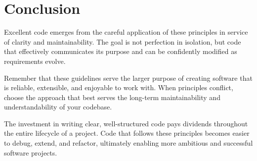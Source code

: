 \documentclass[11pt,a4paper]{article}
\begin{document}
\section{Conclusion}

Excellent code emerges from the careful application of these principles in service of clarity and maintainability. The goal is not perfection in isolation, but code that effectively communicates its purpose and can be confidently modified as requirements evolve.

Remember that these guidelines serve the larger purpose of creating software that is reliable, extensible, and enjoyable to work with. When principles conflict, choose the approach that best serves the long-term maintainability and understandability of your codebase.

The investment in writing clear, well-structured code pays dividends throughout the entire lifecycle of a project. Code that follows these principles becomes easier to debug, extend, and refactor, ultimately enabling more ambitious and successful software projects.
\end{document}
